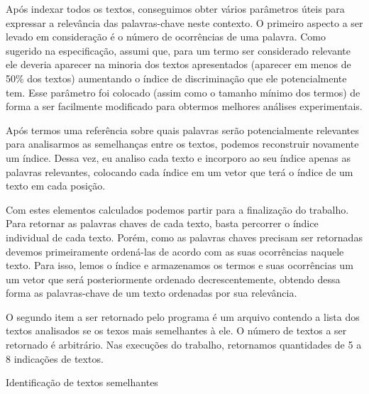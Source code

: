 \documentclass[12pt]{article}
\begin{document}
Após indexar todos os textos, conseguimos obter vários parâmetros úteis para
expressar a relevância das palavras-chave neste contexto. O primeiro aspecto a ser
levado em consideração é o número de ocorrências de uma palavra. Como sugerido
na especificação, assumi que, para um termo ser considerado relevante ele
deveria aparecer na minoria dos textos apresentados (aparecer em menos de 50\%
dos textos) aumentando o índice de discriminação que ele potencialmente tem.
Esse parâmetro foi colocado (assim como o tamanho mínimo dos termos) de forma a
ser facilmente modificado para obtermos melhores análises experimentais.

Após termos uma referência sobre quais palavras serão potencialmente relevantes
para analisarmos as semelhanças entre os textos, podemos reconstruir novamente
um índice. Dessa vez, eu analiso cada texto e incorporo ao seu índice apenas as
palavras relevantes, colocando cada índice em um vetor que terá o índice de um texto 
em cada posição.

Com estes elementos calculados podemos partir para a finalização do trabalho.
Para retornar as palavras chaves de cada texto, basta percorrer o índice
individual de cada texto. Porém, como as palavras chaves precisam ser retornadas
devemos primeiramente ordená-las de acordo com as suas ocorrências naquele
texto. Para isso, lemos o índice e armazenamos os termos e suas ocorrências um
um vetor que será posteriormente ordenado decrescentemente, obtendo dessa forma
as palavras-chave de um texto ordenadas por sua relevância.

O segundo item a ser retornado pelo programa é um arquivo contendo a lista dos
textos analisados se os texos mais semelhantes à ele. O número de textos a ser
retornado é arbitrário. Nas execuções do trabalho, retornamos quantidades de 5 a
8 indicações de textos.

\begin{algorithm}[h!]
\begin{footnotesize}
\caption{Identificação de textos semelhantes}
\end{footnotesize}
\end{algorithm}
\end{document}
